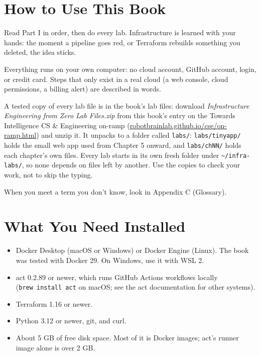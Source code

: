 \section{How to Use This Book}\label{00-preface:how-to-use-this-book}

Read Part I in order, then do every lab. Infrastructure is learned with your hands: the moment a pipeline goes red, or Terraform rebuilds something you deleted, the idea sticks.

Everything runs on your own computer: no cloud account, GitHub account, login, or credit card. Steps that only exist in a real cloud (a web console, cloud permissions, a billing alert) are described in words.

A tested copy of every lab file is in the book's lab files: download \emph{Infrastructure Engineering from Zero Lab Files.zip} from this book's entry on the Towards Intelligence CS \& Engineering on-ramp (\href{https://robotbrainlab.github.io/cse/on-ramp.html}{robotbrainlab.github.io/cse/on-ramp.html}) and unzip it. It unpacks to a folder called \texttt{labs/}: \texttt{labs/tinyapp/} holds the small web app used from Chapter 5 onward, and \texttt{labs/chNN/} holds each chapter's own files. Every lab starts in its own fresh folder under \texttt{\textasciitilde{}/infra-labs/}, so none depends on files left by another. Use the copies to check your work, not to skip the typing.

When you meet a term you don't know, look in Appendix C (Glossary).

\section{What You Need Installed}\label{00-preface:what-you-need-installed}

\begin{itemize}
\tightlist
\item
  Docker Desktop (macOS or Windows) or Docker Engine (Linux). The book was tested with Docker 29. On Windows, use it with WSL 2.
\item
  act 0.2.89 or newer, which runs GitHub Actions workflows locally (\texttt{brew\ install\ act} on macOS; see the act documentation for other systems).
\item
  Terraform 1.16 or newer.
\item
  Python 3.12 or newer, git, and curl.
\item
  About 5 GB of free disk space. Most of it is Docker images; act's runner image alone is over 2 GB.
\end{itemize}

